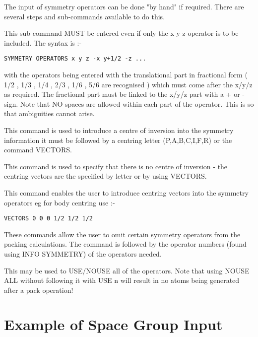 \documentclass[10pt,a4paper]{report}
\begin{document}
\bigskip{}




The input of symmetry operators can be done "by hand" if
required.
There are several steps and sub-commands available to do this.


\bigskip{}


This sub-command MUST be entered even if only the x y z
operator is to
be included. The syntax is :-
\small\begin{verbatim}
SYMMETRY OPERATORS x y z -x y+1/2 -z ...
\end{verbatim}\normalsize


with the operators being entered with the translational part in
fractional form ( 1/2 , 1/3 , 1/4 , 2/3 , 1/6 , 5/6 are
recognised )
which must come after the x/y/z as required. The
fractional
part must be linked to the x/y/z part with a + or - sign. Note
that NO
spaces are allowed within each part of the operator. This is so
that
ambiguities cannot arise.


\bigskip{}


This command is used to introduce a centre of inversion into
the
symmetry information it must be followed by a centring letter 
(P,A,B,C,I,F,R) or the command VECTORS.


\bigskip{}


This command is used to specify that there is no centre of
inversion - the centring vectors are the specified by letter or by using
VECTORS.


\bigskip{}


This command enables the user to introduce centring vectors
into the
symmetry operators eg for body centring use :-
\small\begin{verbatim}
VECTORS 0 0 0 1/2 1/2 1/2
\end{verbatim}\normalsize




\bigskip{}


\bigskip{}
These commands allow the user to omit certain symmetry operators from
the packing calculations. The command is followed by the operator
numbers
(found using INFO SYMMETRY) of the operators needed.


\bigskip{}
This may be used to USE/NOUSE all of the operators. Note that using
NOUSE ALL without following it with USE n will result in no atoms being
generated after a pack operation!
\section{Example of Space Group Input}
\end{document}
